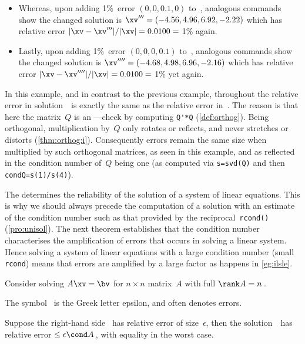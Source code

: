 \begin{example}
\begin{solution}
\begin{itemize}
\item Whereas, upon adding 1\%~error \((0,0,0.1,0)\) to~\bv, analogous commands show the changed solution is \(\xv'''=(-4.56,4.96,6.92,-2.22)\) which has relative error \(|\xv-\xv'''|/|\xv|=0.0100={}\)1\% again.

\item Lastly, upon adding 1\%~error \((0,0,0,0.1)\) to~\bv, analogous commands show the changed solution is \(\xv''''=(-4.68,4.98,6.96,-2.16)\) which has relative error \(|\xv-\xv''''|/|\xv|=0.0100={}\)1\% yet again.

\end{itemize}
In this example, and in contrast to the previous example, throughout the relative error in solution~\xv\ is exactly the same as the relative error in~\bv.
The reason is that here the matrix~\(Q\) is an ---check by computing \verb|Q'*Q| (\autoref{def:orthog}).
Being orthogonal, multiplication by~\(Q\) only rotates or reflects, and never stretches or distorts (\autoref{thm:orthog:i}).
Consequently errors remain the same size when multiplied by such orthogonal matrices, as seen in this example, and as reflected in the condition number of~\(Q\) being one (as computed via \verb|s=svd(Q)| and then \verb|condQ=s(1)/s(4)|).
\end{solution}
\end{example}





The  determines the reliability of the solution of a system of linear equations.
This is why we should always precede the computation of a solution with an estimate of the condition number such as that provided by the reciprocal~\verb|rcond()| (\autoref{pro:unisol}). 
The next theorem establishes that the condition number characterises the amplification of errors that occurs in solving a linear system.
Hence solving a system of linear equations with a large condition number (small \verb|rcond|) means that errors are amplified by a large factor as happens in \autoref{eg:ilsle}.

\begin{theorem} \label{thm:erramp}
Consider solving \(A\xv=\bv\) for \(n\times n\) matrix~\(A\) with full \(\rank A=n\)\,.  
\begin{aside}
The symbol~\idx{$\epsilon$} is the Greek letter epsilon, and often denotes errors.
\end{aside}%
Suppose the right-hand side \bv~has relative error of size~\(\epsilon\), then the solution~\xv\ has relative error\({}\leq\epsilon\cond A\)\,, with equality in the worst case.
\end{theorem}

